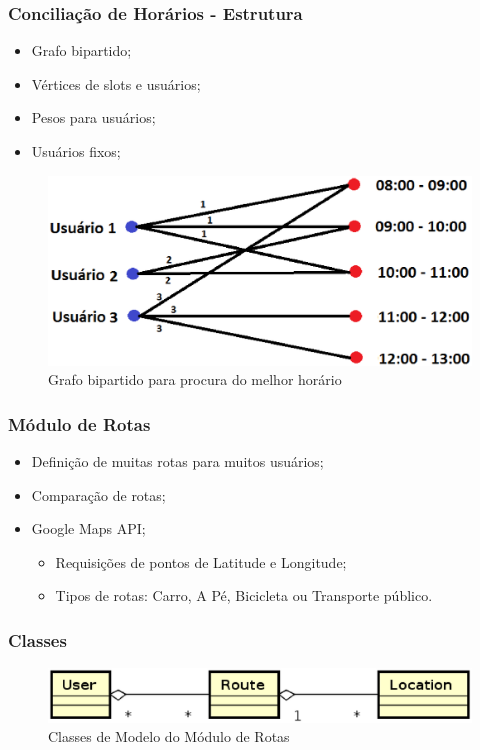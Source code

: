 \documentclass{beamer}
\begin{document}
\begin{frame}
\frametitle{Conciliação de Horários - Estrutura}

\begin{itemize}
	\item Grafo bipartido;
	\item Vértices de slots e usuários;
	\item Pesos para usuários;
	\item Usuários fixos;
\end{itemize}

\begin{figure}[h]
	\centering
	\includegraphics[scale=0.35]{figuras/melhor_horario.eps}
	\caption{Grafo bipartido para procura do melhor horário}
\end{figure}

\end{frame}

\begin{frame}
\frametitle{Módulo de Rotas}

\begin{itemize}
	\item Definição de muitas rotas para muitos usuários;
	\item Comparação de rotas;
	\item Google Maps API;
	\begin{itemize}
		\item Requisições de pontos de Latitude e Longitude;
		\item Tipos de rotas: Carro, A Pé, Bicicleta ou Transporte público.
	\end{itemize}
\end{itemize}

\end{frame}

\begin{frame}
\frametitle{Classes}

\begin{figure}[!h]
	\centering
	\includegraphics[scale=0.6]{figuras/modulo_rotas.eps}
	\caption{Classes de Modelo do Módulo de Rotas}
\end{figure}

\end{frame}
\end{document}

